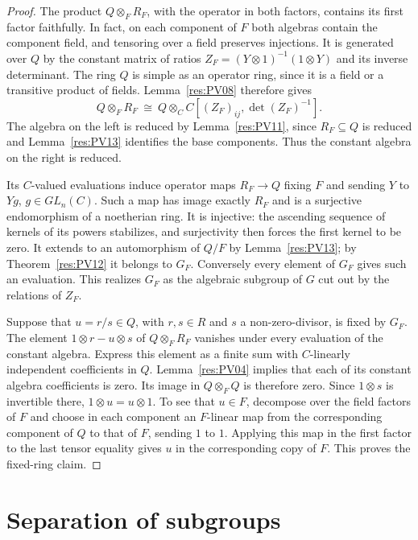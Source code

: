 \documentclass[11pt,oneside,openany]{book}
\theoremstyle{definition}
\theoremstyle{remark}
\begin{document}
\begin{proof}
The product \(Q\otimes_F R_F\), with the operator in both
factors, contains its first factor faithfully. In fact, on
each component of \(F\) both algebras contain the component
field, and tensoring over a field preserves injections.
It is generated over \(Q\) by the constant matrix of ratios
\(Z_F=(Y\otimes1)^{-1}(1\otimes Y)\) and its inverse determinant.
The ring \(Q\) is simple as an operator ring, since it is a
field or a transitive product of fields. Lemma~\ref{res:PV08}
therefore gives
\[
 Q\otimes_F R_F \ \cong\
 Q\otimes_C C[(Z_F)_{ij},\det(Z_F)^{-1}].
\]
The algebra on the left is reduced by
Lemma~\ref{res:PV11}, since \(R_F\subseteq Q\) is reduced and
Lemma~\ref{res:PV13} identifies the base components. Thus
the constant algebra on the right is reduced.

Its \(C\)-valued evaluations induce operator maps \(R_F\to Q\)
fixing \(F\) and sending \(Y\) to \(Yg\), \(g\in GL_n(C)\).
Such a map has image exactly \(R_F\) and is a surjective
endomorphism of a noetherian ring. It is injective: the ascending
sequence of kernels of its powers stabilizes, and surjectivity
then forces the first kernel to be zero. It extends to an
automorphism of \(Q/F\) by Lemma~\ref{res:PV13}; by
Theorem~\ref{res:PV12} it belongs to \(G_F\). Conversely every
element of \(G_F\) gives such an evaluation. This realizes \(G_F\)
as the algebraic subgroup of \(G\) cut out by the relations of
\(Z_F\).

Suppose that \(u=r/s\in Q\), with \(r,s\in R\) and \(s\)
a non-zero-divisor, is fixed by \(G_F\). The element
\(1\otimes r-u\otimes s\) of \(Q\otimes_F R_F\) vanishes under
every evaluation of the constant algebra. Express this element
as a finite sum with \(C\)-linearly independent coefficients in
\(Q\). Lemma~\ref{res:PV04} implies that each of its constant
algebra coefficients is zero. Its image in \(Q\otimes_F Q\)
is therefore zero. Since \(1\otimes s\) is invertible there,
\(1\otimes u=u\otimes1\).
To see that \(u\in F\), decompose over the field factors of \(F\)
and choose in each component an \(F\)-linear map from the
corresponding component of \(Q\) to that of \(F\), sending \(1\)
to \(1\). Applying this map in the first factor to the last
tensor equality gives \(u\) in the corresponding copy of \(F\).
This proves the fixed-ring claim.
\end{proof}

\section{Separation of subgroups}
\end{document}
